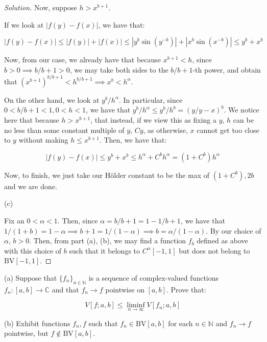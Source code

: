 \documentclass[10pt]{article}
\newcommand{\bv}{{\text{BV}}}
\newenvironment{problem}[2][Problem]{\begin{trivlist}
\item[\hskip \labelsep {\bfseries #1}\hskip \labelsep {\bfseries #2.}]}{\end{trivlist}}
\begin{document}
\begin{proof}[Solution]
Now, suppose $h > x^{b+1}$.

If we look at $|f(y) - f(x)|$, we have that:

$$ |f(y) - f(x)| \leq |f(y)| + |f(x)| \leq | y^b \sin (y^{-b})|  +  |x^b \sin (x^{-b})| \leq y^b + x^b$$

Now, from our case, we already have that because $x^{b+1} < h$, since $b > 0 \implies b/b+1 > 0$, we may take both sides to the $b/b+1$-th power, and obtain that $(x^{b+1})^{b/b+1} < h^{b/b+1} \implies x^b < h^\alpha$.

On the other hand, we look at $y^b/h^\alpha$. In particular, since $0 < b/b+1 < 1, 0 < h < 1$, we have that $y^b/h^\alpha \leq y^b/h^b = (y/y-x)^b$. We notice here that because $h > x^{b+1}$, that instead, if we view this as fixing a $y$, $h$ can be no less than some constant multiple of $y$, $Cy$, as otherwise, $x$ cannot get too close to $y$ without making $h \leq x^{b+1}$. Then, we have that:

$$ |f(y) - f(x)| \leq  y^b + x^b \leq h^\alpha + C^b h^\alpha = (1 + C^b) h^\alpha$$

Now, to finish, we just take our H\"older constant to be the max of $(1 + C^b), 2b$ and we are done.

(c)

Fix an $0 < \alpha < 1$. Then, since $\alpha = b/b+1 = 1 - 1/b+1$, we have that $1/(1 + b) = 1 - \alpha \implies b+1 = 1/(1-\alpha) \implies b = \alpha/(1-\alpha)$. By our choice of $\alpha$, $b > 0$. Then, from part (a), (b), we may find a function $f_b$ defined as above with this choice of $b$ such that it belongs to $C^\alpha[-1,1]$ but does not belong to $\bv[-1,1]$.



\end{proof}

\begin{problem}{5.2.23}

(a) Suppose that $\{ f_n \}_{n \in \mathbb{N}}$ is a sequence of complex-valued functions $f_n: [a,b] \to \mathbb{C}$ and that $f_n \to f$ pointwise on $[a,b]$. Prove that:

$$ V[f;a,b] \leq \liminf_{n \to \infty} V[f_n; a,b]$$

(b) Exhibit functions $f_n, f$ such that $f_n \in \bv[a,b]$ for each $n \in \mathbb{N}$ and $f_n \to f$ pointwise, but $f \not \in \bv[a,b]$.
\end{problem}
\end{document}
